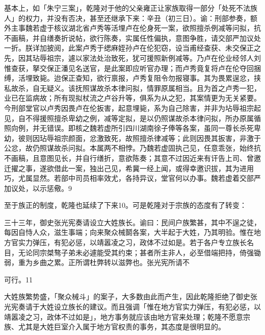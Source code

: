 
\noindent 基本上，如「朱宁三案」，乾隆对于他的父亲雍正让家族取得一部分「处死不法族人」的权力，并没有否决，甚至还继承下来：辛丑（初三日）。谕：刑部参奏，额外主事魏若虚于核议湖北省卢秀等活埋卢在伦身死一案，欲照擅杀例减等问拟，抗不画稿，并自缮奏折说帖，欲行陈奏，实属任性偏执，意图争胜，请交部严加议处一折。朕详加披阅，此案卢秀于缌麻姪孙卢在伦犯窃，设当甫经查获、未交保正之先，因其玷辱祖宗，遽以家法处治致死，犹可援照新例减等。乃卢在伦业经邻人刘惟查获，拏交保正潘见名送官，是此案即应听官办理；而卢秀竟复将卢在伦夺回捆缚，活埋致毙。迨保正查知，欲行禀报，卢秀复阻令勿报寝事。其为畏累逞忿，挟私故杀，自无疑义。该抚照谋故杀本律问拟，情罪原属相当。且为首之卢秀一犯，业已在监病故；所有现拟杖流之卢谷升等，俱系为从之犯，其案情更为无关紧要。今刑部堂官以卢秀因畏卢在伦扳害，起意埋毙，系为自己除害，并非为坫辱祖宗起见，自不得援照擅杀卑幼之例，减等定拟，是以仍照谋故杀本律问拟，所办原属循照向例，并无错误。即核之魏若虚所引四川湖南徐子俸等各案，虽同一尊长杀死卑幼，彼则因玷辱祖宗颜面，忿激致死，故照擅杀律减等；此则因畏其扳害，非激于公忿，故仍照谋故杀问拟。本属两不相悖。乃魏若虚固执己见，任意乖张，始终抗不画稿，且意图见长，并自行缮折，意欲陈奏；其意不过因近来有讦告上司、曾邀迁擢之事，遂欲借此一案，独出己见，希冀一经上闻，或得幸邀识拔，其为进用巧，尤属显然。若部中司员相率效尤，各持异议，堂官何以办事。魏若虚着交部严加议处，以示惩儆。9

\vfill
\begin{BookNotes}
\end{BookNotes}

至于族正的制度，乾隆也延续了下来10。可是乾隆对于宗族的态度有了转变：

\begin{BookQuote}
三十三年，御史张光宪奏请设立大姓族长。谕曰：民间户族繁甚，其中不逞之徒，每因自恃人众，滋生事端；向来聚众械鬬各案，大半起于大姓，乃其明验。惟在地方官实力弹压，有犯必惩，以靖嚣凌之习，政体不过如是。若于各户专立族长名目，无论同宗桀骜子弟未必遽能受其约束；甚者所主非人，必至借端把持，倚强锄弱，重为乡曲之累。正所谓杜弊转以滋弊也。张光宪所请不
\end{BookQuote}

可行。11

大姓族繁势盛，「聚众械斗」的案子，大多数由此而产生，因此乾隆拒绝了御史张光宪奏请于大姓设立族长的建议。而且强调「惟在地方官实力弹压，有犯必惩，以靖嚣凌之习，政体不过如是」，地方事务就应该由地方官来处理；乾隆不愿意宗族、尤其是大姓巨室介入属于地方官权责的事务，其态度是很明显的。

